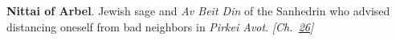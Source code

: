 \textbf{Nittai of Arbel}. Jewish sage and \emph{Av Beit Din} of the Sanhedrin who advised distancing oneself from bad neighbors in \emph{Pirkei Avot}. \emph{[Ch.~\hyperref[ch:jewishcalendar]{26}]}

